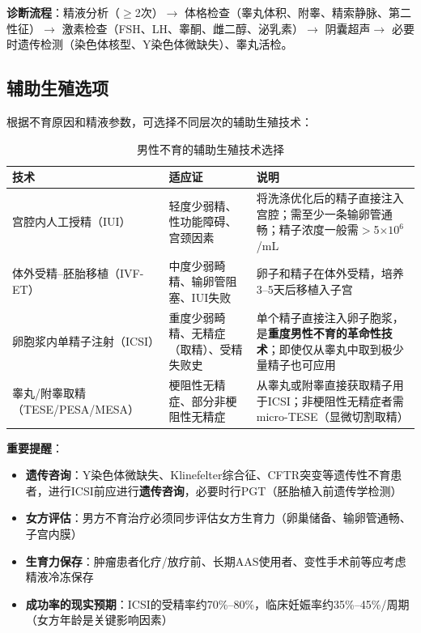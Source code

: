 \documentclass[12pt,a4paper,twoside]{ctexbook}
\begin{document}
\textbf{诊断流程}：精液分析（$\ge$2次）$\rightarrow$ 体格检查（睾丸体积、附睾、精索静脉、第二性征）$\rightarrow$ 激素检查（FSH、LH、睾酮、雌二醇、泌乳素）$\rightarrow$ 阴囊超声$\rightarrow$ 必要时遗传检测（染色体核型、Y染色体微缺失）、睾丸活检。

\subsection{辅助生殖选项}

根据不育原因和精液参数，可选择不同层次的辅助生殖技术：

\begin{table}[htbp]
\centering
\caption{男性不育的辅助生殖技术选择}
\label{tab:art_options}
\begin{tabularx}{\textwidth}{@{}lXX@{}}
    \toprule
    \textbf{技术} & \textbf{适应证} & \textbf{说明} \\
    \midrule
    宫腔内人工授精（IUI） & 轻度少弱精、性功能障碍、宫颈因素 & 将洗涤优化后的精子直接注入宫腔；需至少一条输卵管通畅；精子浓度一般需$>$5$\times10^6$/mL \\
    \midrule
    体外受精--胚胎移植（IVF-ET） & 中度少弱畸精、输卵管阻塞、IUI失败 & 卵子和精子在体外受精，培养3--5天后移植入子宫 \\
    \midrule
    卵胞浆内单精子注射（ICSI） & 重度少弱畸精、无精症（取精）、受精失败史 & 单个精子直接注入卵子胞浆，是\textbf{重度男性不育的革命性技术}；即使仅从睾丸中取到极少量精子也可应用 \\
    \midrule
    睾丸/附睾取精（TESE/PESA/MESA） & 梗阻性无精症、部分非梗阻性无精症 & 从睾丸或附睾直接获取精子用于ICSI；非梗阻性无精症者需micro-TESE（显微切割取精） \\
    \bottomrule
\end{tabularx}
\end{table}

\textbf{重要提醒}：
\begin{itemize}[leftmargin=2cm]
	\item \textbf{遗传咨询}：Y染色体微缺失、Klinefelter综合征、CFTR突变等遗传性不育患者，进行ICSI前应进行\textbf{遗传咨询}，必要时行PGT（胚胎植入前遗传学检测）
	\item \textbf{女方评估}：男方不育治疗必须同步评估女方生育力（卵巢储备、输卵管通畅、子宫内膜）
	\item \textbf{生育力保存}：肿瘤患者化疗/放疗前、长期AAS使用者、变性手术前等应考虑精液冷冻保存
	\item \textbf{成功率的现实预期}：ICSI的受精率约70\%--80\%，临床妊娠率约35\%--45\%/周期（女方年龄是关键影响因素）
\end{itemize}
\end{document}
